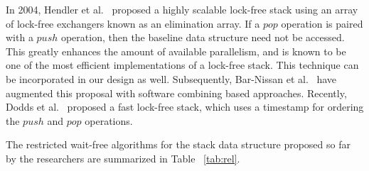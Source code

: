 \documentclass{llncs}
\begin{document}
In 2004, Hendler et al.~\cite{LockFree} proposed a highly scalable lock-free
stack using  an array of lock-free exchangers known as an elimination array.
If a $pop$ operation is paired with a $push$ operation, then the baseline data structure need
not be accessed. This greatly enhances the amount of available parallelism, and
is known to be one of the most efficient implementations of a lock-free stack. 
This technique can be incorporated in our design as well.
Subsequently, Bar-Nissan et al.~\cite{DECS} have augmented this proposal with
software combining based approaches. 
Recently, Dodds et al.~\cite{timestamp} proposed a fast lock-free stack, which uses a
timestamp for ordering the $push$ and $pop$ operations.

The restricted wait-free algorithms for the stack data structure proposed so far by the researchers are summarized
in Table ~\ref{tab:rel}.
\end{document}
